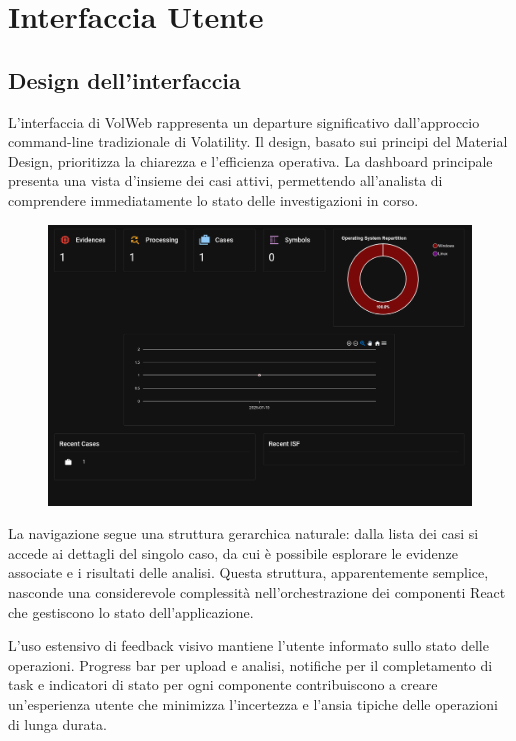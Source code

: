 \section{Interfaccia Utente}

\subsection{Design dell'interfaccia}

L'interfaccia di VolWeb rappresenta un departure significativo dall'approccio command-line tradizionale di Volatility. Il design, basato sui principi del Material Design, prioritizza la chiarezza e l'efficienza operativa. La dashboard principale presenta una vista d'insieme dei casi attivi, permettendo all'analista di comprendere immediatamente lo stato delle investigazioni in corso.

\begin{figure}[H]
    \centering
    \includegraphics[width=1\linewidth]{images/volweb-original/volweb-dashboard.png}
\end{figure}

La navigazione segue una struttura gerarchica naturale: dalla lista dei casi si accede ai dettagli del singolo caso, da cui è possibile esplorare le evidenze associate e i risultati delle analisi. Questa struttura, apparentemente semplice, nasconde una considerevole complessità nell'orchestrazione dei componenti React che gestiscono lo stato dell'applicazione.

L'uso estensivo di feedback visivo mantiene l'utente informato sullo stato delle operazioni. Progress bar per upload e analisi, notifiche per il completamento di task e indicatori di stato per ogni componente contribuiscono a creare un'esperienza utente che minimizza l'incertezza e l'ansia tipiche delle operazioni di lunga durata.

